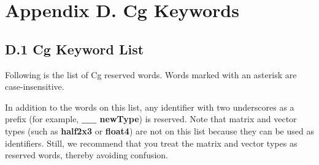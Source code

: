 \documentclass[../main.tex]{subfiles}
\begin{document}
\chapter{Appendix D. Cg Keywords}

\section{D.1 Cg Keyword List}

Following is the list of Cg reserved words. Words marked with an asterisk are case-insensitive.

In addition to the words on this list, any identifier with two underscores as a prefix (for example, \textbf{__ newType}) is reserved. Note that matrix and vector types (such as \textbf{half2x3} or \textbf{float4}) are not on this list because they can be used as identifiers. Still, we recommend that you treat the matrix and vector types as reserved words, thereby avoiding confusion.
\end{document}
